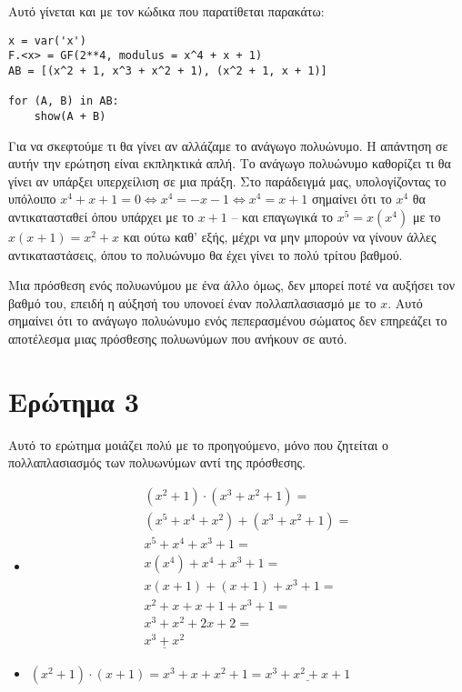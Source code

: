 \documentclass{article}
\begin{document}
Αυτό γίνεται και με τον κώδικα που παρατίθεται παρακάτω:

\begin{lstlisting}
x = var('x')
F.<x> = GF(2**4, modulus = x^4 + x + 1)
AB = [(x^2 + 1, x^3 + x^2 + 1), (x^2 + 1, x + 1)]

for (A, B) in AB:
    show(A + B)
\end{lstlisting}

Για να σκεφτούμε τι θα γίνει αν αλλάζαμε το ανάγωγο πολυώνυμο. Η απάντηση σε αυτήν την ερώτηση είναι εκπληκτικά απλή. Το ανάγωγο πολυώνυμο καθορίζει τι θα γίνει αν υπάρξει υπερχείλιση σε μια πράξη. Στο παράδειγμά μας, υπολογίζοντας το υπόλοιπο $x^4 + x + 1 = 0 \Leftrightarrow x^4 = -x - 1 \Leftrightarrow x^4 = x + 1$ σημαίνει ότι το $x^4$ θα αντικατασταθεί όπου υπάρχει με το $x + 1$ -- και επαγωγικά το $x^5 = x(x^4)$ με το $x(x + 1) = x^2 + x$ και ούτω καθ' εξής, μέχρι να μην μπορούν να γίνουν άλλες αντικαταστάσεις, όπου το πολυώνυμο θα έχει γίνει το πολύ τρίτου βαθμού.

Μια πρόσθεση ενός πολυωνύμου με ένα άλλο όμως, δεν μπορεί ποτέ να αυξήσει τον βαθμό του, επειδή η αύξησή του υπονοεί έναν πολλαπλασιασμό με το $x$. Αυτό σημαίνει ότι το ανάγωγο πολυώνυμο ενός πεπερασμένου σώματος δεν επηρεάζει το αποτέλεσμα μιας πρόσθεσης πολυωνύμων που ανήκουν σε αυτό.

\section*{Ερώτημα 3}

Αυτό το ερώτημα μοιάζει πολύ με το προηγούμενο, μόνο που ζητείται ο πολλαπλασιασμός των πολυωνύμων αντί της πρόσθεσης.

\begin{itemize}
    \item
        \begin{align*}
        (x^2 + 1) \cdot (x^3 + x^2 + 1) = \\
        (x^5 + x^4 + x^2) + (x^3 + x^2 + 1) = \\
        x^5 + x^4 + x^3 + 1 = \\
        x(x^4) + x^4 + x^3 + 1 = \\
        x(x + 1) + (x + 1) + x^3 + 1 = \\
        x^2 + x + x + 1 + x^3 + 1 = \\
        x^3 + x^2 + 2x + 2 = \\
        \underline{x^3 + x^2}
        \end{align*}
    \item $(x^2 + 1) \cdot (x + 1) = x^3 + x + x^2 + 1 = \underline{x^3 + x^2 + x + 1}$
\end{itemize}
\end{document}
